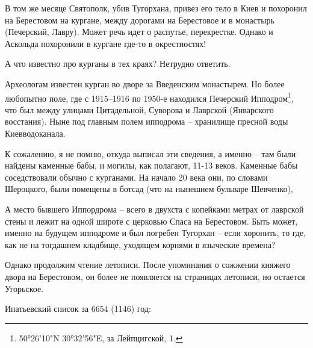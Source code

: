 В том же месяце Святополк, убив Тугорхана, привез его тело в Киев и похоронил на Берестовом на кургане, между дорогами на Берестовое и в монастырь (Печерский, Лавру). Может речь идет о распутье, перекрестке. Однако и Аскольда похоронили в кургане где-то в окрестностях!

А что известно про курганы в тех краях? Нетрудно ответить.


Археологам известен курган во дворе за Введенским монастырем. Но более любопытно поле, где с 1915–1916 по 1950-е находился Печерский Ипподром\footnote{50°26'10"N 30°32'56"E, за Лейпцигской, 1.}, что был между улицами Цитадельной, Суворова и Лаврской (Январского восстания). Ныне под главным полем ипподрома – хранилище пресной воды Киевводоканала.

К сожалению, я не помню, откуда выписал эти сведения, а именно – там были найдены каменные бабы, и могилы, как полагают, 11-13 веков. Каменные бабы соседствовали обычно с курганами. На начало 20 века они, по словами Шероцкого, были помещены в ботсад (что на нынешнем бульваре Шевченко),

А место бывшего Иппордрома – всего в двухста с копейками метрах от лаврской стены и лежит на одной широте с церковью Спаса на Берестовом. Быть может, именно на будущем ипподроме и был погребен Тугорхан – если хоронить, то где, как не на тогдашнем кладбище, уходящем корнями в языческие времена?

Однако продолжим чтение летописи. После упоминания о сожжении княжего двора на Берестовом, он более не появляется на страницах летописи, но остается Угорьское.

Ипатьевский список за 6654 (1146) год:

